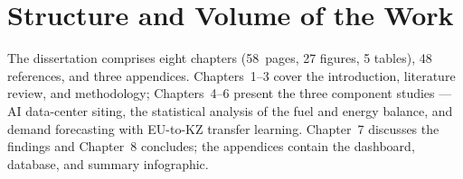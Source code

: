 \section{Structure and Volume of the Work}
\label{sec:structure}

The dissertation comprises eight chapters (58~pages, 27 figures, 5 tables), 48 references, and three appendices. Chapters~1--3 cover the introduction, literature review, and methodology; Chapters~4--6 present the three component studies --- AI data-center siting, the statistical analysis of the fuel and energy balance, and demand forecasting with EU-to-KZ transfer learning. Chapter~7 discusses the findings and Chapter~8 concludes; the appendices contain the dashboard, database, and summary infographic.
